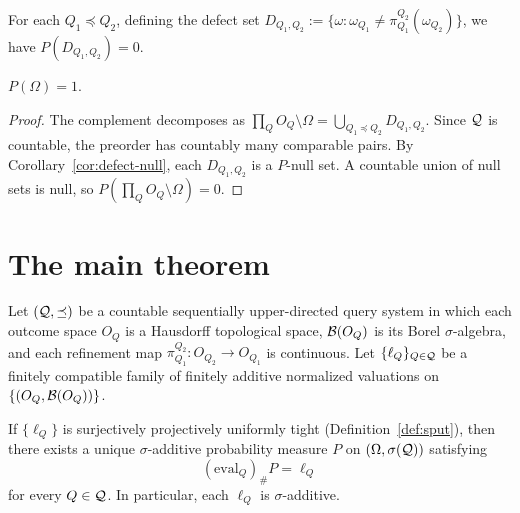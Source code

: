 \begin{corollary}
\label{cor:defect-null}
For each $Q_1 \preceq Q_2$, defining the defect set
$D_{Q_1,Q_2} := \{\omega : \omega_{Q_1} \neq
\pi^{Q_2}_{Q_1}(\omega_{Q_2})\}$, we have $P(D_{Q_1,Q_2}) = 0$.
\end{corollary}

\begin{theorem}
\label{thm:concentration}
$P(\Omega) = 1$.
\end{theorem}

\begin{proof}
The complement decomposes as
$\prod_Q O_Q \setminus \Omega = \bigcup_{Q_1 \preceq Q_2}
D_{Q_1,Q_2}$.
Since $\mathcal{Q}$ is countable, the preorder has countably many
comparable pairs.  By Corollary~\ref{cor:defect-null}, each
$D_{Q_1,Q_2}$ is a $P$-null set.  A countable union of null sets
is null, so $P(\prod_Q O_Q \setminus \Omega) = 0$.
\end{proof}

\section{The main theorem}\label{sec:main}

\begin{theorem}
\label{thm:main}
Let $(\mathcal{Q}, \preceq)$ be a countable sequentially upper-directed
query system in which each outcome space $O_Q$ is a Hausdorff
topological space, $\mathcal{B}(O_Q)$ is its Borel $\sigma$-algebra, and
each refinement map $\pi^{Q_2}_{Q_1} : O_{Q_2} \to O_{Q_1}$ is
continuous.  Let $\{\ell_Q\}_{Q \in \mathcal{Q}}$ be a finitely compatible
family of finitely additive normalized valuations on $\{(O_Q,
\mathcal{B}(O_Q))\}$.

If $\{\ell_Q\}$ is surjectively projectively uniformly tight
(Definition~\ref{def:sput}), then there exists a unique
$\sigma$-additive probability measure $P$ on
$(\Omega, \sigma(\mathcal{Q}))$ satisfying
\[
(\mathrm{eval}_Q)_\# P = \ell_Q
\]
for every $Q \in \mathcal{Q}$.  In particular, each $\ell_Q$ is
$\sigma$-additive.
\end{theorem}

